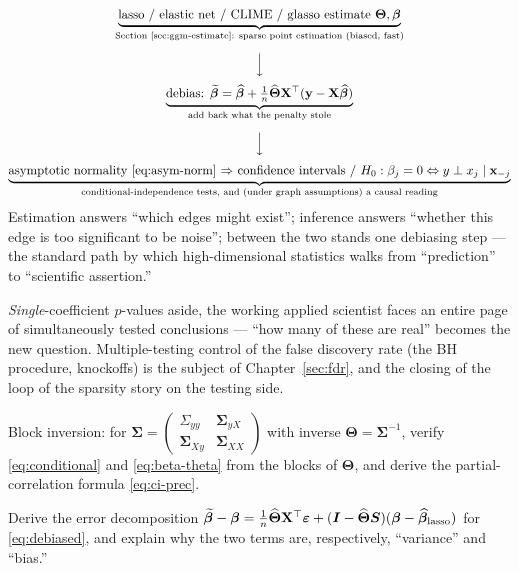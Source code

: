 \begin{keybox}
\[
\begin{gathered}
\underbrace{\text{lasso / elastic net / CLIME / glasso estimate }\bm{\Theta},\bm{\beta}}_{\text{Section~\ref{sec:ggm-estimate}: sparse point estimation (biased, fast)}}
\\[1.2ex]
\Big\downarrow
\\[0.6ex]
\underbrace{\text{debias: }\widetilde{\bm{\beta}} = \widehat{\bm{\beta}} + \tfrac1n\widehat{\bm{\Theta}}\mathbf{X}^\top(\mathbf{y} - \mathbf{X}\widehat{\bm{\beta}})}_{\text{add back what the penalty stole}}
\\[1.2ex]
\Big\downarrow
\\[0.6ex]
\underbrace{\text{asymptotic normality \eqref{eq:asym-norm} $\Rightarrow$ confidence intervals / } H_0:\beta_j=0 \Leftrightarrow y \perp x_j \mid \mathbf{x}_{-j}}_{\text{conditional-independence tests, and (under graph assumptions) a causal reading}}
\end{gathered}
\]
Estimation answers ``which edges might exist''; inference answers ``whether this edge is too significant to be noise''; between the two stands one debiasing step — the standard path by which high-dimensional statistics walks from ``prediction'' to ``scientific assertion.''
\end{keybox}

\textit{Single}-coefficient $p$-values aside, the working applied scientist faces an entire page of simultaneously tested conclusions — ``how many of these are real'' becomes the new question. Multiple-testing control of the false discovery rate (the BH procedure, knockoffs) is the subject of Chapter~\ref{sec:fdr}, and the closing of the loop of the sparsity story on the testing side.

\begin{exercise}\label{ex:block-inv}
Block inversion: for $\bm{\Sigma} = \begin{pmatrix} \Sigma_{yy} & \bm{\Sigma}_{yX} \\ \bm{\Sigma}_{Xy} & \bm{\Sigma}_{XX} \end{pmatrix}$ with inverse $\bm{\Theta} = \bm{\Sigma}^{-1}$, verify \eqref{eq:conditional} and \eqref{eq:beta-theta} from the blocks of $\bm{\Theta}$, and derive the partial-correlation formula \eqref{eq:ci-prec}.
\end{exercise}

\begin{exercise}\label{ex:debiased}
Derive the error decomposition $\widetilde{\bm{\beta}} - \bm{\beta} = \frac{1}{n}\widehat{\bm{\Theta}}\mathbf{X}^\top\bm{\varepsilon} + (\bm{I} - \widehat{\bm{\Theta}}\bm{S})(\bm{\beta} - \widehat{\bm{\beta}}_{\mathrm{lasso}})$ for \eqref{eq:debiased}, and explain why the two terms are, respectively, ``variance'' and ``bias.''
\end{exercise}


